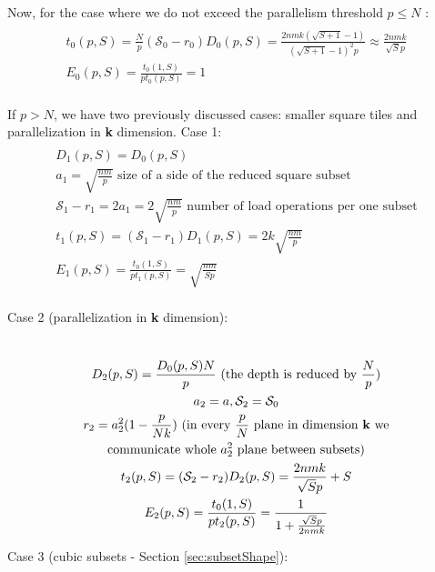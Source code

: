\documentclass[sigconf]{acmart}
\begin{document}
Now, for the case where we do not exceed the parallelism threshold  $p \le N$ : 
\begin{multline}
\\
t_0(p,S) = \frac{N}{p} (\mathcal{S}_0 - r_0) D_0(p,S) = \frac{2nmk(\sqrt{S+1} 
	- 
	1)}{(\sqrt{S+1} - 1)^2 p} \approx \frac{2nmk}{\sqrt{S} p}  \\
E_0(p,S) = \frac{t_0(1,S)}{p t_0(p,S)} = 1 \\
\end{multline}

If  $p > N$, we have two previously discussed cases: smaller square tiles and 
parallelization in \textbf{k} dimension. Case 1:
\begin{multline}
\\
D_1(p,S) = D_0(p,S) \\
a_1 = \sqrt{\frac{nm}{p}} \text{ size of a side of the reduced square 
	subset} \\
\mathcal{S}_1 - r_1 = 2a_1 = 2\sqrt{\frac{nm}{p}} \text{ number of load 
	operations per one subset} \\
t_1(p,S) = (\mathcal{S}_1 - r_1) D_1(p,S) = 2k \sqrt{\frac{nm}{p}}  \\
E_1(p,S) = \frac{t_0(1,S)}{p t_1(p,S)} = \sqrt{\frac{nm}{Sp}} \\
\end{multline}

Case 2 (parallelization in \textbf{k} dimension): 

\begin{multline}
\\
D_2(p,S) = \frac{D_0(p,S)N}{p} \text{ (the depth is reduced by } \frac{N}{p} 
\text{)}\\
a_2 = a , \mathcal{S}_2 = \mathcal{S}_0\\ 
r_2 = a_2^2(1 - \frac{p}{Nk}) \text{ (in every $\frac{p}{N}$ plane in dimension 
	\textbf{k} we} \\
\text{communicate whole $a_2^2$ plane between subsets)} \\
t_2(p,S) = (\mathcal{S}_2 - r_2) D_2(p,S)  = \frac{2nmk}{\sqrt{S}p} + S  \\
E_2(p,S) = \frac{t_0(1,S)}{p t_2(p,S)} = \frac{1}{1 + \frac{\sqrt{S}p}{2nmk}} \\
\end{multline}

Case 3 (cubic subsets - Section \ref{sec:subsetShape}):
\end{document}
